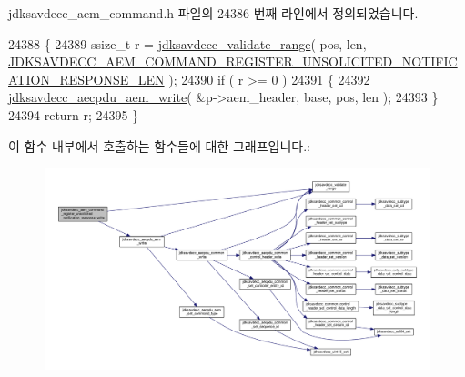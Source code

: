 jdksavdecc\+\_\+aem\+\_\+command.\+h 파일의 24386 번째 라인에서 정의되었습니다.


\begin{DoxyCode}
24388 \{
24389     ssize\_t r = \hyperlink{group__util_ga9c02bdfe76c69163647c3196db7a73a1}{jdksavdecc\_validate\_range}( pos, len, 
      \hyperlink{group__command__register__unsolicited__notification__response_ga25450d50a8a3a6d8a0094181bd597ec9}{JDKSAVDECC\_AEM\_COMMAND\_REGISTER\_UNSOLICITED\_NOTIFICATION\_RESPONSE\_LEN}
       );
24390     \textcolor{keywordflow}{if} ( r >= 0 )
24391     \{
24392         \hyperlink{group__aecpdu__aem_gad658e55771cce77cecf7aae91e1dcbc5}{jdksavdecc\_aecpdu\_aem\_write}( &p->aem\_header, base, pos, len );
24393     \}
24394     \textcolor{keywordflow}{return} r;
24395 \}
\end{DoxyCode}


이 함수 내부에서 호출하는 함수들에 대한 그래프입니다.\+:
\nopagebreak
\begin{figure}[H]
\begin{center}
\leavevmode
\includegraphics[width=350pt]{group__command__register__unsolicited__notification__response_ga807fa9da3adbac0600c192dc4b3e30f5_cgraph}
\end{center}
\end{figure}


